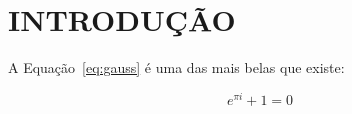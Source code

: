 \section*{INTRODUÇÃO} %

\lipsum[2]

A Equação~\eqref{eq:gauss} é uma das mais belas que existe:

\begin{equation}\label{eq:gauss}
  e^{\pi i} + 1 = 0
\end{equation}

\lipsum[1-4]
